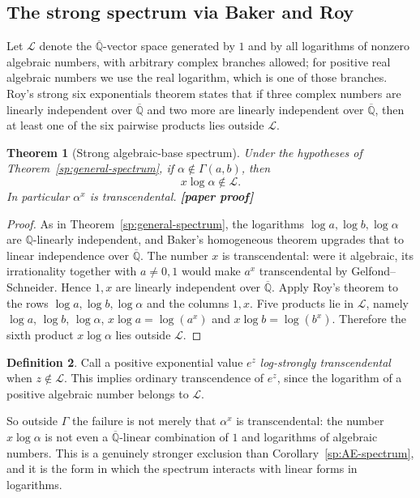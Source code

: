 \documentclass[11pt,oneside]{article}
\newtheorem{theorem}{Theorem}[section]
\theoremstyle{definition}
\newtheorem{definition}[theorem]{Definition}
\theoremstyle{remark}
\newcommand{\Q}{\mathbb Q}
\newcommand{\Abar}{\overline{\mathbb Q}}
\newcommand{\LL}{\mathcal L}
\newcommand{\GammaSat}{\Gamma}
\newcommand{\Qbar}{\Abar}
\newcommand{\statusnew}{\textcolor{newgreen}{\textbf{[paper proof]}}}
\begin{document}
\subsection{The strong spectrum via Baker and Roy}

Let $\LL$ denote the $\Qbar$-vector space generated by $1$ and by all logarithms of nonzero
algebraic numbers, with arbitrary complex branches allowed; for positive real algebraic
numbers we use the real logarithm, which is one of those branches.  Roy's strong six
exponentials theorem \cite{Roy1992,Waldschmidt2005} states that if three complex numbers are
linearly independent over $\Qbar$ and two more are linearly independent over $\Qbar$, then at
least one of the six pairwise products lies outside $\LL$.

\begin{theorem}[Strong algebraic-base spectrum]\label{sp:strong-spectrum}
Under the hypotheses of Theorem~\ref{sp:general-spectrum}, if
$\alpha\notin\GammaSat(a,b)$, then
\[
  x\log\alpha\notin\LL.
\]
In particular $\alpha^{x}$ is transcendental.  \statusnew
\end{theorem}

\begin{proof}
As in Theorem~\ref{sp:general-spectrum}, the logarithms $\log a,\log b,\log\alpha$ are
$\Q$-linearly independent, and Baker's homogeneous theorem \cite{Baker1975} upgrades that to
linear independence over $\Qbar$.  The number $x$ is transcendental: were it algebraic, its
irrationality together with $a\ne0,1$ would make $a^{x}$ transcendental by
Gelfond--Schneider.  Hence $1,x$ are linearly independent over $\Qbar$.  Apply Roy's theorem
to the rows $\log a,\log b,\log\alpha$ and the columns $1,x$.  Five products lie in $\LL$,
namely $\log a$, $\log b$, $\log\alpha$, $x\log a=\log(a^{x})$ and $x\log b=\log(b^{x})$.
Therefore the sixth product $x\log\alpha$ lies outside $\LL$.
\end{proof}

\begin{definition}\label{sp:log-strong}
Call a positive exponential value $e^{z}$ \emph{log-strongly transcendental} when
$z\notin\LL$.  This implies ordinary transcendence of $e^{z}$, since the logarithm of a
positive algebraic number belongs to $\LL$.
\end{definition}

So outside $\GammaSat$ the failure is not merely that $\alpha^{x}$ is transcendental: the
number $x\log\alpha$ is not even a $\Qbar$-linear combination of $1$ and logarithms of
algebraic numbers.  This is a genuinely stronger exclusion than
Corollary~\ref{sp:AE-spectrum}, and it is the form in which the spectrum interacts with
linear forms in logarithms.
\end{document}
